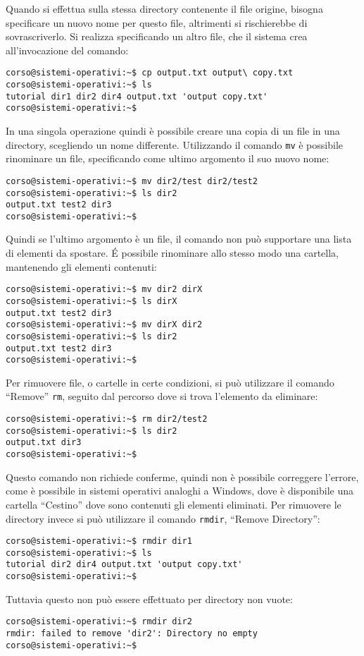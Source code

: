 \documentclass{article}
\numberwithin{equation}{subsection}
\begin{document}
Quando si effettua sulla stessa directory contenente il file origine, bisogna specificare un nuovo nome per questo file, altrimenti si rischierebbe di sovrascriverlo. Si realizza specificando un altro file, 
che il sistema crea all'invocazione del comando:
\begin{verbatim}
corso@sistemi-operativi:~$ cp output.txt output\ copy.txt
corso@sistemi-operativi:~$ ls
tutorial dir1 dir2 dir4 output.txt 'output copy.txt'
corso@sistemi-operativi:~$
\end{verbatim}
In una singola operazione quindi è possibile creare una copia di un file in una directory, scegliendo un nome differente. Utilizzando il comando \verb|mv| è possibile rinominare un file, specificando come 
ultimo argomento il suo nuovo nome:
\begin{verbatim}
corso@sistemi-operativi:~$ mv dir2/test dir2/test2
corso@sistemi-operativi:~$ ls dir2
output.txt test2 dir3
corso@sistemi-operativi:~$
\end{verbatim} 
Quindi se l'ultimo argomento è un file, il comando non può supportare una lista di elementi da spostare. \'{E} possibile rinominare allo stesso modo una cartella, mantenendo gli elementi contenuti:
\begin{verbatim}
corso@sistemi-operativi:~$ mv dir2 dirX
corso@sistemi-operativi:~$ ls dirX
output.txt test2 dir3
corso@sistemi-operativi:~$ mv dirX dir2
corso@sistemi-operativi:~$ ls dir2
output.txt test2 dir3
corso@sistemi-operativi:~$
\end{verbatim}

Per rimuovere file, o cartelle in certe condizioni, si può utilizzare il comando ``Remove'' \verb|rm|, seguito dal percorso dove si trova l'elemento da eliminare:
\begin{verbatim}
corso@sistemi-operativi:~$ rm dir2/test2
corso@sistemi-operativi:~$ ls dir2
output.txt dir3
corso@sistemi-operativi:~$
\end{verbatim}
Questo comando non richiede conferme, quindi non è possibile correggere l'errore, come è possibile in sistemi operativi analoghi a Windows, dove è disponibile una cartella ``Cestino'' dove sono contenuti gli 
elementi eliminati. Per rimuovere le directory invece si può utilizzare il comando \verb|rmdir|, ``Remove Directory'':
\begin{verbatim}
corso@sistemi-operativi:~$ rmdir dir1
corso@sistemi-operativi:~$ ls
tutorial dir2 dir4 output.txt 'output copy.txt'
corso@sistemi-operativi:~$
\end{verbatim}
Tuttavia questo non può essere effettuato per directory non vuote: 
\begin{verbatim}
corso@sistemi-operativi:~$ rmdir dir2
rmdir: failed to remove 'dir2': Directory no empty 
corso@sistemi-operativi:~$
\end{verbatim}
\end{document}
